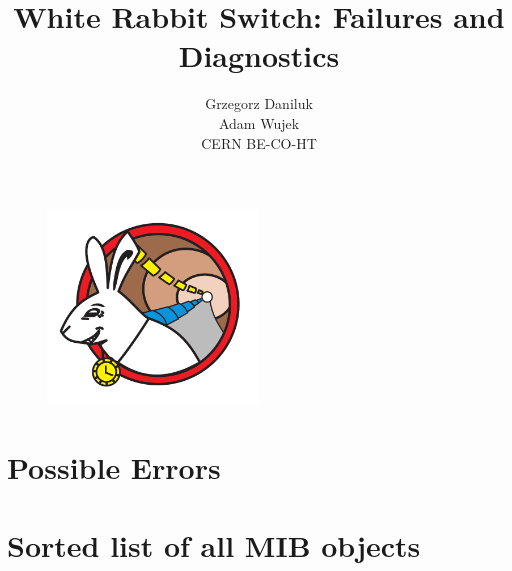 \documentclass[a4paper, 12pt]{article}
\begin{document}
\setcounter{tocdepth}{2}

\title{White Rabbit Switch: Failures and Diagnostics}
\author{Grzegorz Daniluk\\ Adam Wujek\\[.5cm] CERN BE-CO-HT\\ \small{\gitrevinfo}}
\maketitle
\thispagestyle{empty}

\begin{figure}[ht!]
  \centering
  \vspace{1.3cm}
  \includegraphics[width=0.50\textwidth]{../images/WRlogo.pdf}
\end{figure}

\newpage

\newpage

\newpage

\tableofcontents

\newpage


\newpage
\section{Possible Errors}
\label{sec:failures}

\newpage


\appendix
\newpage
\section{Sorted list of all MIB objects}
\label{sec:snmp_exports:sorted}
\printnoidxglossary[type=snmp_all,style=tree,sort=letter]


\forallglsentries{\thislabel}%
{%
  \ifglsused{\thislabel}{}{\glsadd[format=ignore]{\thislabel}}%
}
\end{document}
